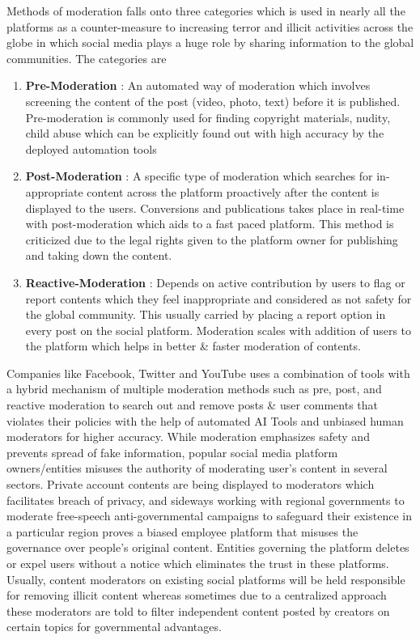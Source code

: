 \documentclass[conference]{IEEEtran}
\begin{document}
Methods of moderation falls onto three categories which is used in nearly all the platforms as a counter-measure to increasing terror and illicit activities across the globe in which social media plays a huge role by sharing information to the global communities. The categories are
\begin{enumerate}[wide, labelwidth=!, labelindent=0pt]
\item \textbf{Pre-Moderation} : An automated way of moderation which involves screening the content of the post (video, photo, text) before it is published. Pre-moderation is commonly used for finding copyright materials, nudity, child abuse which can be explicitly found out with high accuracy by the deployed automation tools
\item \textbf{Post-Moderation} : A specific type of moderation which searches for in-appropriate content across the platform proactively after the content is displayed to the users. Conversions and publications takes place in real-time with post-moderation which aids to a fast paced platform. This method is criticized due to the legal rights given to the platform owner for publishing and taking down the content.
\item \textbf{Reactive-Moderation} : Depends on active contribution by users to flag or report contents which they feel inappropriate and considered as not safety for the global community. This usually carried by placing a report option in every post on the social platform. Moderation scales with addition of users to the platform which helps in better \& faster moderation of contents.
\end{enumerate}

Companies like Facebook, Twitter and YouTube uses a combination of tools with a hybrid mechanism of multiple moderation methods such as pre, post, and reactive moderation to search out and remove posts \& user comments that violates their policies with the help of automated AI Tools and unbiased human moderators for higher accuracy. While moderation emphasizes safety and prevents spread of fake information, popular social media platform owners/entities misuses the authority of moderating user's content in several sectors. Private account contents are being displayed to moderators which facilitates breach of privacy, and sideways working with regional governments to moderate free-speech anti-governmental campaigns to safeguard their existence in a particular region proves a biased employee platform that misuses the governance over people's original content. Entities governing the platform deletes or expel users without a notice which eliminates the trust in these platforms. Usually, content moderators on existing social platforms will be held responsible for removing illicit content whereas sometimes due to a centralized approach these moderators are told to filter independent content posted by creators on certain topics for governmental advantages.\\
\end{document}
